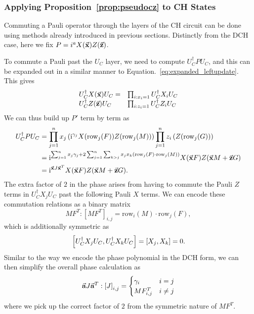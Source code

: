 \subsubsection{Applying Proposition~\ref{prop:pseudocz} to CH States}
Commuting a Pauli operator through the layers of the CH circuit can be done using methods already introduced in previous sections. Distinctly from the DCH case, here we fix $P=i^{a}X(\va{x})Z(\va{z})$.\par
To commute a Pauli past the $U_{C}$ layer, we need to compute $U_{C}^{\dagger}PU_{C}$, and this can be expanded out in a similar manner to Equation.~\ref{eq:expanded_leftupdate}. This gives
\[
\begin{array}{l l}
U_{C}^{\dagger}X(\va{x})U_{C} = & \prod_{i:x_{i}=1}U_{C}^{\dagger}X_{i}U_{C}\\
U_{C}^{\dagger}Z(\va{z})U_{C} & \prod_{i:z_{i}=1}U_{C}^{\dagger}Z_{i}U_{C}
\end{array}
\]
We can thus build up $P'$ term by term as
\begin{align}
U_{C}^{\dagger}PU_{C} &= \prod_{j=1}^{n}x_{j}\left(\mathrm{i}^{\gamma_{j}}X(\text{row}_{j}(F))Z(\text{row}_{j}(M))\right)\prod_{j=1}^{n}z_{i}\left(Z(\text{row}_{j}(G))\right) \nonumber \\
&= \mathrm{i}^{\sum_{j=1}^{n} x_{j}\gamma_{j} + 2\sum_{j=1}^{n}\sum_{k>j}x_{j}x_{k}\left( \text{row}_{j}(F)\cdot\text{row}_{j}(M) \right)}X(\va{x}F)Z(\va{x}M+\va{z}G) \nonumber \\
&= \mathrm{i}^{\va{x}J\va{x}^{T}}X(\va{x}F)Z(\va{x}M+\va{z}G).
\label{eq:tableau_update_pauli}
\end{align}
The extra factor of $2$ in the phase arises from having to commute the Pauli $Z$ terms in $U_{C}^{\dagger}X_{j}U_{C}$ past the following Pauli $X$ terms. We can encode these commutation relations as a binary matrix
\[MF^{T} : \left[MF^{T}\right]_{i,j} = \text{row}_{i}(M)\cdot \text{row}_{j}(F),\]
which is additionally symmetric as 
\[\comm{U_{C}^{\dagger}X_{j}U_{C}}{U_{C}^{\dagger}X_{k}U_{C}} = \comm{X_{j}}{X_{k}} = 0.\]
Similar to the way we encode the phase polynomial in the DCH form, we can then simplify the overall phase calculation as
\[\va{a}J\va{a}^{T} : \left[J\right]_{i,j} = \begin{cases} \gamma_{i} & i=j \\ MF^{T}_{i,j} & i\neq j \end{cases}\]
where we pick up the correct factor of $2$ from the symmetric nature of $MF^{T}$.
